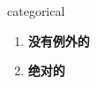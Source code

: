 
\begin{frame}
{\huge categorical}
\begin{center}
\begin{enumerate}\Large
  \item \textbf{没有例外的}
  \item \textbf{绝对的}
\end{enumerate}
\end{center}
\end{frame}
